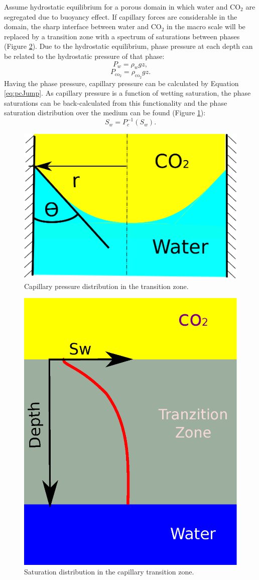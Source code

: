 Assume hydrostatic equilibrium for a porous domain in which water and
$\mbox{CO}_2$ are segregated due to buoyancy effect.  If capillary forces
are considerable in the domain, the sharp interface between water and
$\mbox{CO}_2$ in the macro scale will be replaced by a transition zone with a
spectrum of saturations between phases (Figure \ref{fig:TZ}). Due to the
hydrostatic equilibrium, phase pressure at each depth can be related to the
hydrostatic pressure of that phase:
\begin{equation}
 P_w=\rho_wgz
 \label{eq:rghw},
\end{equation}
\begin{equation}
 P_{\mbox{co}_2}=\rho_{\mbox{co}_2}gz
 \label{eq:rghc}.
\end{equation} Having the phase pressure, capillary pressure can be calculated
by
Equation  \ref{eq:pcJump}. As capillary pressure is a function of wetting
saturation, the phase saturations can be back-calculated from this functionality
and the phase saturation distribution over the medium can be found (Figure
\ref{fig:PC}):
\begin{equation}
 S_w = P_c^{-1}(S_w).
 \label{eq:pc-1}
\end{equation}



\begin{figure}
 \centering{}
 \includegraphics[width=0.35\linewidth]{./figurer/pipe.eps}
 \caption{Capillary pressure distribution in the transition zone.}
 \label{fig:PC}
\end{figure}

\begin{figure}[thb]
 \centering{}
 \includegraphics[width=0.35\linewidth]{./figurer/pch.eps}
 \caption{Saturation distribution in the capillary transition zone.}
 \label{fig:TZ}
\end{figure}



